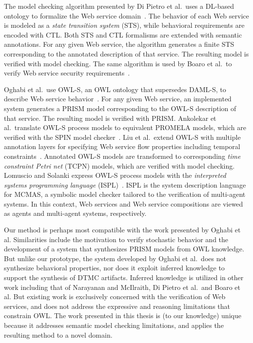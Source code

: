 The model checking algorithm presented by Di Pietro et al.\ uses a DL-based ontology to formalize the Web service domain~\cite{Di_Pietro_2012}. The behavior of each Web service is modeled as a \emph{state transition system} (STS), while behavioral requirements are encoded with CTL\@. Both STS and CTL formalisms are extended with semantic annotations. For any given Web service, the algorithm generates a finite STS corresponding to the annotated description of that service. The resulting model is verified with model checking. The same algorithm is used by Boaro et al.\ to verify Web service security requirements~\cite{Boaro_2010}.

Oghabi et al.\ use OWL-S, an OWL ontology that supersedes DAML-S, to describe Web service behavior~\cite{Oghabi_2011}. For any given Web service, an implemented system generates a PRISM model corresponding to the OWL-S description of that service. The resulting model is verified with PRISM\@. Ankolekar et al.\ translate OWL-S process models to equivalent PROMELA models, which are verified with the SPIN model checker~\cite{Ankolekar_2005}. Liu et al.\ extend OWL-S with multiple annotation layers for specifying Web service flow properties including temporal constraints~\cite{Liu_2008}. Annotated OWL-S models are transformed to corresponding \emph{time constraint Petri net} (TCPN) models, which are verified with model checking. Lomuscio and Solanki express OWL-S process models with the \emph{interpreted systems programming language} (ISPL)~\cite{Lomuscio_2009}. ISPL is the system description language for MCMAS, a symbolic model checker tailored to the verification of multi-agent systems. In this context, Web services and Web service compositions are viewed as agents and multi-agent systems, respectively.

Our method is perhaps most compatible with the work presented by Oghabi et al. Similarities include the motivation to verify stochastic behavior and the development of a system that synthesizes PRISM models from OWL knowledge. But unlike our prototype, the system developed by Oghabi et al.\ does not synthesize behavioral properties, nor does it exploit inferred knowledge to support the synthesis of DTMC artifacts. Inferred knowledge is utilized in other work including that of Narayanan and McIlraith, Di Pietro et al.\ and Boaro et al. But existing work is exclusively concerned with the verification of Web services, and does not address the expressive and reasoning limitations that constrain OWL\@. The work presented in this thesis is (to our knowledge) unique because it addresses semantic model checking limitations, and applies the resulting method to a novel domain.

